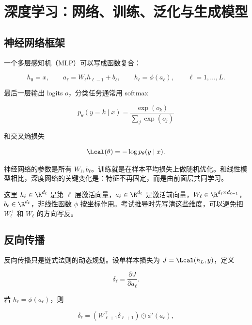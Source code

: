 \section{深度学习：网络、训练、泛化与生成模型}


\subsection{神经网络框架}

一个多层感知机（MLP）可以写成函数复合：

\[
  h_0=x,
  \qquad
  a_\ell=W_\ell h_{\ell-1}+b_\ell,
  \qquad
  h_\ell=\phi(a_\ell),
  \qquad
  \ell=1,\ldots,L.
\]

最后一层输出 logits \(o\)，分类任务通常用 softmax

\[
  p_\theta(y=k\mid x)
  =
  \frac{\exp(o_k)}{\sum_{j}\exp(o_j)}
\]

和交叉熵损失

\[
  \Lcal(\theta)
  =
  -\log p_\theta(y\mid x).
\]

神经网络的参数是所有 \(W_\ell,b_\ell\)。训练就是在样本平均损失上做随机优化。和线性模型相比，深度网络的关键变化是：特征不再固定，而是由前面层共同学习。

这里 \(h_\ell\in\R^{d_\ell}\) 是第 \(\ell\) 层激活向量，\(a_\ell\in\R^{d_\ell}\) 是激活前向量，\(W_\ell\in\R^{d_\ell\times d_{\ell-1}}\)，\(b_\ell\in\R^{d_\ell}\)，非线性函数 \(\phi\) 按坐标作用。考试推导时先写清这些维度，可以避免把 \(W_\ell^\top\) 和 \(W_\ell\) 的方向写反。

\subsection{反向传播}


反向传播只是链式法则的动态规划。设单样本损失为 \(J=\Lcal(h_L,y)\)，定义

\[
  \delta_\ell=\frac{\partial J}{\partial a_\ell}.
\]

若 \(h_\ell=\phi(a_\ell)\)，则

\[
  \delta_\ell
  =
  (W_{\ell+1}^\top \delta_{\ell+1})
  \odot
  \phi'(a_\ell),
\]

